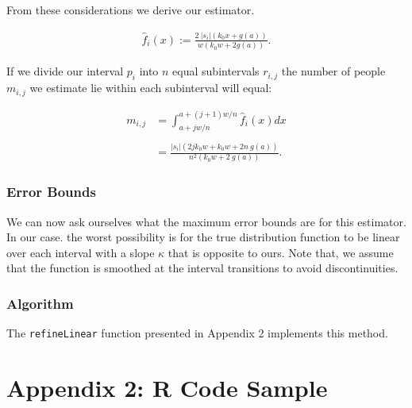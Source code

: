\documentclass[]{article}
\begin{document}
From these considerations we derive our estimator.

\begin{align*}
\hat{f}_i (x) := \frac{2\ |s_i| (k_0 x + g (a))}{w(k_0 w + 2 g(a))}.
\end{align*}

If we divide our interval \(p_i\) into \(n\) equal subintervals
\(r_{i,j}\) the number of people \(m_{i,j}\) we estimate lie within each
subinterval will equal:

\begin{align*}
m_{i,j} &= \int_{a+jw/n}^{a+(j+1)w/n} \hat{f}_i (x) dx\\
\\
&= \frac{|s_i|(2 j k_0 w + k_0 w + 2 n\ g(a))}{n^2 (k_0 w + 2\ g(a))}.
\end{align*}

\hypertarget{error-bounds-2}{%
\subsubsection{Error Bounds}\label{error-bounds-2}}

We can now ask ourselves what the maximum error bounds are for this
estimator. In our case. the worst possibility is for the true
distribution function to be linear over each interval with a slope
\(\kappa\) that is opposite to ours. Note that, we assume that the
function is smoothed at the interval transitions to avoid
discontinuities.

\hypertarget{algorithm-2}{%
\subsubsection{Algorithm}\label{algorithm-2}}

The \texttt{refineLinear} function presented in Appendix 2 implements
this method.

\hypertarget{appendix-2-r-code-sample}{%
\section{Appendix 2: R Code Sample}\label{appendix-2-r-code-sample}}
\end{document}
